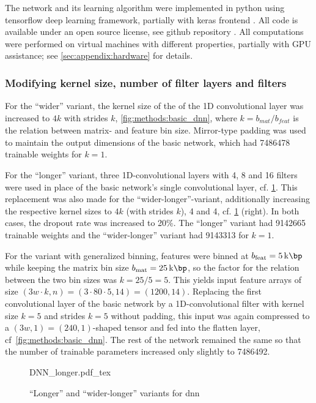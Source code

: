The network and its learning algorithm were implemented in python using tensorflow deep learning framework, partially with keras frontend \cite{Abadi2015,Chollet2015}.
All code is available under an open source license, see github repository \cite{Krauth2021b}. 
All computations were performed on virtual machines with different properties, partially with GPU assistance; see \ref{sec:appendix:hardware} for details.

\subsubsection{Modifying kernel size, number of filter layers and filters} \label{sec:methods:variants}
For the ``wider'' variant, the kernel size of the of the 1D convolutional layer was increased to $4k$ with strides $k$, \cref{fig:methods:basic_dnn},
where $k=b_\mathit{mat}/b_\mathit{feat}$ is the relation between matrix- and feature bin size.
Mirror-type padding was used to maintain the output dimensions of the basic network, which had \SI{7486478}{} trainable weights
for $k=1$.

For the ``longer'' variant, three 1D-convolutional layers with 4, 8 and 16 filters 
were used in place of the basic network's single convolutional layer, cf. \cref{fig:methods:longer_dnn}.
This replacement was also made for the ``wider-longer''-variant, 
additionally increasing the respective kernel sizes to $4k$ (with strides $k$), 4 and 4, cf. \cref{fig:methods:longer_dnn} (right).
In both cases, the dropout rate was increased to 20\%.
The ``longer'' variant had \SI{9142665}{} trainable weights and the ``wider-longer'' variant had \SI{9143313}{} for $k=1$.

For the variant with generalized binning, features were binned at $b_\textrm{feat} = \SI{5}{\kilo\bp}$ while keeping the matrix bin size $b_\textrm{mat} = \SI{25}{\kilo\bp}$,
so the factor for the relation between the two bin sizes was $k=25/5=5$.
This yields input feature arrays of size $(3w\cdot k, n) = (3\cdot80\cdot5 , 14) = (1200, 14)$.
Replacing the first convolutional layer of the basic network by a 1D-convolutional filter with kernel size $k=5$ and strides $k=5$ without padding,
this input was again compressed to a $(3w, 1) = (240, 1)$-shaped tensor and fed into the flatten layer, cf~\cref{fig:methods:basic_dnn}. 
The rest of the network remained the same so that the number of trainable parameters increased only slightly to \SI{7486492}{}.
\begin{figure}[p]
    \small
    \centering
    {DNN_longer.pdf_tex}
    \caption{``Longer'' and ``wider-longer'' variants for \acrshort{dnn}}
    \label{fig:methods:longer_dnn}
\end{figure}

